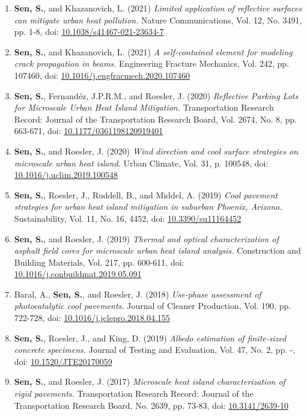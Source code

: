 \documentclass[12pt]{article}
\begin{document}
\begin{enumerate}
	\item \textbf{Sen, S.}, and Khazanovich, L. (2021) \textit{Limited application of reflective surfaces can mitigate urban heat pollution.} Nature Communications, Vol. 12, No. 3491, pp. 1-8, doi: \href{https://doi.org/10.1038/s41467-021-23634-7}{10.1038/s41467-021-23634-7}
	\item \textbf{Sen, S.}, and Khazanovich, L. (2021) \textit{A self-contained element for modeling crack propagation in beams.} Engineering Fracture Mechanics, Vol. 242, pp. 107460, doi: \href{https://doi.org/10.1016/j.engfracmech.2020.107460}{10.1016/j.engfracmech.2020.107460}			
	\item \textbf{Sen, S.}, Fernand\'ez, J.P.R.M., and Roesler, J. (2020) \textit{Reflective Parking Lots for Microscale Urban Heat Island Mitigation.}  Transportation Research Record: Journal of the Transportation Research Board, Vol. 2674, No. 8, pp. 663-671, doi: \href{https://doi.org/10.1177/0361198120919401}{10.1177/0361198120919401}	
		\item \textbf{Sen, S.}, and Roesler, J. (2020) \textit{Wind direction and cool surface strategies on microscale urban heat island.}  Urban Climate, Vol. 31, p. 100548, doi: \href{https://doi.org/10.1016/j.uclim.2019.100548}{10.1016/j.uclim.2019.100548}
	\item \textbf{Sen, S.}, Roesler, J., Ruddell, B., and Middel, A. (2019) \textit{Cool pavement strategies for urban heat island mitigation in suburban Phoenix, Arizona.}  Sustainability, Vol. 11, No. 16, 4452, doi: \href{https://doi.org/10.3390/su11164452}{10.3390/su11164452}
		\item \textbf{Sen, S.}, and Roesler, J. (2019) \textit{Thermal and optical characterization of asphalt field cores for microscale urban heat island analysis.}  Construction and Building Materials, Vol. 217, pp. 600-611, doi: \href{https://doi.org/10.1016/j.conbuildmat.2019.05.091}{10.1016/j.conbuildmat.2019.05.091}
	\item Baral, A., \textbf{Sen, S.}, and Roesler, J. (2018) \textit{Use-phase assessment of photocatalytic cool pavements.}  Journal of Cleaner Production, Vol. 190, pp. 722-728, doi: \href{https://doi.org/10.1016/j.jclepro.2018.04.155}{10.1016/j.jclepro.2018.04.155}
	\item \textbf{Sen, S.}, Roesler, J., and King, D. (2019) \textit{Albedo estimation of finite-sized concrete specimens.} Journal of Testing and Evaluation, Vol. 47, No. 2, pp. -, doi: \href{https://doi.org/10.1520/JTE20170059}{10.1520/JTE20170059}
	\item \textbf{Sen, S.}, and Roesler, J. (2017) \textit{Microscale heat island characterization of rigid pavements.} Transportation Research Record: Journal of the Transportation Research Board, No. 2639, pp. 73-83, doi: \href{http://dx.doi.org/10.3141/2639-10}{10.3141/2639-10}

\end{enumerate}
\end{document}
